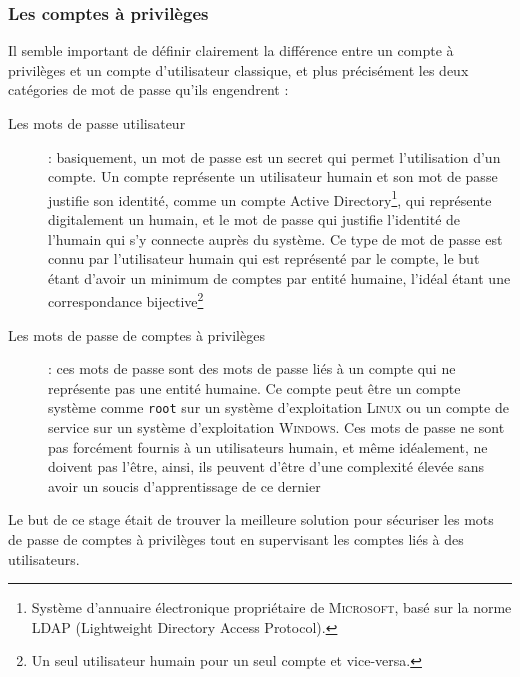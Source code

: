 \subsubsection{Les comptes à privilèges}
Il semble important de définir clairement la différence entre un compte à privilèges et un compte d'utilisateur classique, et plus précisément les deux catégories de mot de passe qu'ils engendrent :
\begin{description}
	\item [Les mots de passe utilisateur] : basiquement, un mot de passe est un secret qui permet l'utilisation d'un compte. Un compte représente un utilisateur humain et son mot de passe justifie son identité, comme un compte Active Directory\footnote{Système d'annuaire électronique propriétaire de \textsc{Microsoft}, basé sur la norme LDAP (Lightweight Directory Access Protocol).}, qui représente digitalement un humain, et le mot de passe qui justifie l'identité de l'humain qui s'y connecte auprès du système. Ce type de mot de passe est connu par l'utilisateur humain qui est représenté par le compte, le but étant d'avoir un minimum de comptes par entité humaine, l'idéal étant une correspondance bijective\footnote{Un seul utilisateur humain pour un seul compte et vice-versa.}
	\item [Les mots de passe de comptes à privilèges] : ces mots de passe sont des mots de passe liés à un compte qui ne représente pas une entité humaine. Ce compte peut être un compte système comme \texttt{root} sur un système d'exploitation \textsc{Linux} ou un compte de service sur un système d'exploitation \textsc{Windows}. Ces mots de passe ne sont pas forcément fournis à un utilisateurs humain, et même idéalement, ne doivent pas l'être, ainsi, ils peuvent d'être d'une complexité élevée sans avoir un soucis d'apprentissage de ce dernier
\end{description}

Le but de ce stage était de trouver la meilleure solution pour sécuriser les mots de passe de comptes à privilèges tout en supervisant les comptes liés à des utilisateurs.



